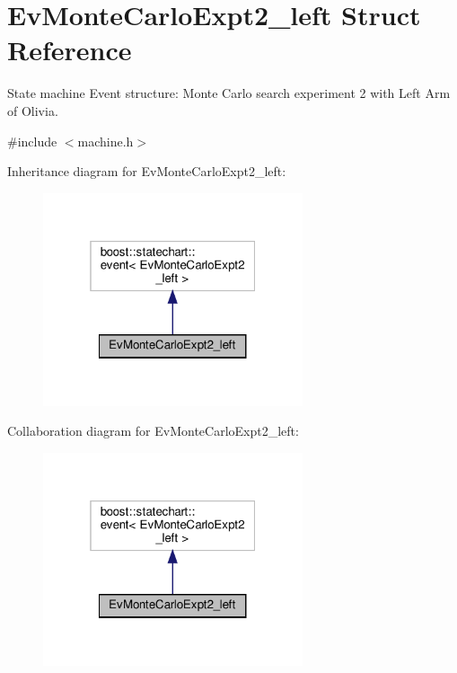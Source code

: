 \hypertarget{structEvMonteCarloExpt2__left}{}\section{Ev\+Monte\+Carlo\+Expt2\+\_\+left Struct Reference}
\label{structEvMonteCarloExpt2__left}


State machine Event structure\+: Monte Carlo search experiment 2 with Left Arm of Olivia.  




{\ttfamily \#include $<$machine.\+h$>$}



Inheritance diagram for Ev\+Monte\+Carlo\+Expt2\+\_\+left\+:
\nopagebreak
\begin{figure}[H]
\begin{center}
\leavevmode
\includegraphics[width=217pt]{structEvMonteCarloExpt2__left__inherit__graph}
\end{center}
\end{figure}


Collaboration diagram for Ev\+Monte\+Carlo\+Expt2\+\_\+left\+:
\nopagebreak
\begin{figure}[H]
\begin{center}
\leavevmode
\includegraphics[width=217pt]{structEvMonteCarloExpt2__left__coll__graph}
\end{center}
\end{figure}


